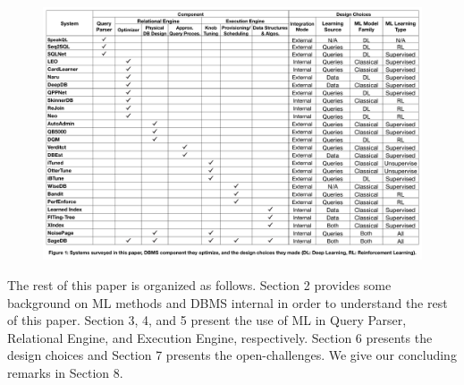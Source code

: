 \begin{figure}
    \centering
    \vspace{-6mm}
    \includegraphics[height=0.85\textwidth, angle=90]{images/taxonomy.pdf}
\end{figure}

The rest of this paper is organized as follows.
Section 2 provides some background on ML methods and DBMS internal in order to understand the rest of this paper.
Section 3, 4, and 5 present the use of ML in Query Parser, Relational Engine, and Execution Engine, respectively.
Section 6 presents the design choices and Section 7 presents the open-challenges.
We give our concluding remarks in Section 8.